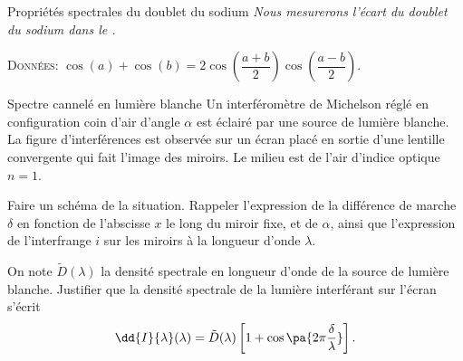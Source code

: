 \begin{exo}[PC][1][TD]{Propriétés spectrales du doublet du sodium}
  \noindent\emph{
  Nous mesurerons l’écart  du doublet du sodium dans le .}

  {\small
\textsc{Données:} $\cos(a) + \cos(b) = 2\cos\left(\dfrac{a+b}{2}\right)\cos\left(\dfrac{a-b}{2}\right)$.
  }

  

\end{exo}

\begin{exo}[PC][2][TD]{Spectre cannelé en lumière blanche}
  Un interféromètre de Michelson réglé en configuration coin d'air d'angle $\alpha$ est éclairé par une source de lumière blanche. La figure d'interférences est observée sur un écran placé en sortie d'une lentille convergente qui fait l'image des miroirs. Le milieu est de l'air d'indice optique $n=1$.
  \begin{quest}
    \item Faire un schéma de la situation. 
    Rappeler l'expression de la différence de marche $\delta$ en fonction de l'abscisse $x$ le long du miroir fixe, et de $\alpha$, ainsi que l'expression de l'interfrange $i$ sur les miroirs à la longueur d'onde $\lambda$.
  \item On note $\tilde{D}(\lambda)$ la densité spectrale en longueur d'onde de la source de lumière blanche. Justifier que la densité spectrale de la lumière interférant sur l'écran s'écrit
  \begin{equation*}
    \dd{I}{\lambda}(\lambda) =  \tilde{D}(\lambda)\left[1 + \cos\pa{2\pi \frac{\delta}{\lambda}}\right].
  \end{equation*}

\end{quest}
\end{exo}
